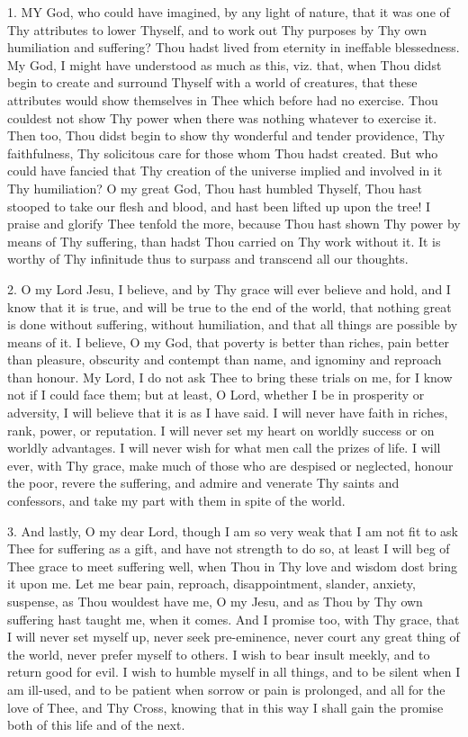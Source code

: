 
1. MY
God, who could have imagined, by any light of nature, that it was one of
Thy attributes to lower Thyself, and to work out Thy purposes by Thy own
humiliation and suffering? Thou hadst lived from eternity in ineffable
blessedness. My God, I might have understood as much as this, viz. that,
when Thou didst begin to create and surround Thyself with a world of
creatures, that these attributes would show themselves in Thee which
before had no exercise. Thou couldest not show Thy power when there was
nothing whatever to exercise it. Then too, Thou didst begin to show thy
wonderful and tender providence, Thy faithfulness, Thy solicitous care
for those whom Thou hadst created. But who could have fancied that Thy
creation of the universe implied and involved in it Thy humiliation? O
my great God, Thou hast humbled Thyself, Thou hast stooped to take our
flesh and blood, and hast been lifted up upon the tree! I praise and
glorify Thee tenfold the more, because Thou hast shown Thy power by
means of Thy suffering, than hadst Thou carried on Thy work without it.
It is worthy of Thy infinitude thus to surpass and transcend all our
thoughts.

2. O my Lord Jesu, I believe,
and by Thy grace will ever believe and hold, and I know that it is true,
and will be true to the end of the world, that nothing great is done
without suffering, without humiliation, and that all things are possible
by means of it. I believe, O my God, that poverty is better than riches,
pain better than pleasure, obscurity and contempt than name, and
ignominy and reproach than honour. My Lord, I do not ask Thee to bring
these trials on me, for I know not if I could face them; but at least, O
Lord, whether I be in prosperity or adversity, I will believe that it is
as I have said. I will never have faith in riches, rank, power, or
reputation. I will never set my heart on worldly success or on worldly
advantages. I will never wish for what men call the prizes of life. I
will ever, with Thy grace, make much of those who are despised or
neglected, honour the poor, revere the suffering, and admire and
venerate Thy saints and confessors, and take my part with them in spite
of the world.

3. And lastly, O my dear Lord,
though I am so very weak that I am not fit to ask Thee for suffering as
a gift, and have not strength to do so, at least I will beg of Thee
grace to meet suffering well, when Thou in Thy love and wisdom dost
bring it upon me. Let me bear pain, reproach, disappointment, slander,
anxiety, suspense, as Thou wouldest have me, O my Jesu, and as Thou by
Thy own suffering hast taught me, when it comes. And I promise too, with
Thy grace, that I will never set myself up, never seek pre-eminence,
never court any great thing of the world, never prefer myself to
others. I wish to bear insult meekly, and to return good for evil. I
wish to humble myself in all things, and to be silent when I am
ill-used, and to be patient when sorrow or pain is prolonged, and all
for the love of Thee, and Thy Cross, knowing that in this way I shall
gain the promise both of this life and of the next.

